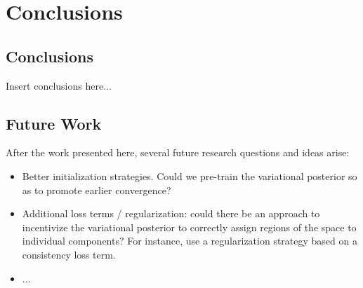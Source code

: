 \chapter{Conclusions}
\label{chapter:conclusions}

\section{Conclusions}
\label{section:conclusions}
Insert conclusions here...

\section{Future Work}
\label{section:future}

After the work presented here, several future research questions and ideas
arise:
\begin{itemize}
    \item Better initialization strategies. Could we pre-train the variational
    posterior so as to promote earlier convergence?
    \item Additional loss terms / regularization: could there be an approach
    to incentivize the variational posterior to correctly assign regions
    of the space to individual components? For instance, \autocite{semisuplearning_nflows}
    use a regularization strategy based on a consistency loss term.
    \item ...
\end{itemize}

